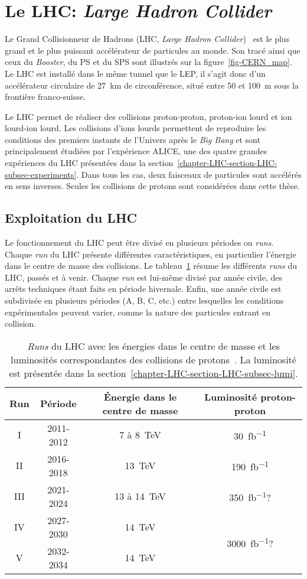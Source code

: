 \section{Le LHC: \emph{Large Hadron Collider}}\label{chapter-LHC-section-LHC}
Le Grand Collisionneur de Hadrons (LHC, \emph{Large Hadron Collider})~\cite{LHC_paper1,LHC_paper2,LHC_paper3} est le plus grand et le plus puissant accélérateur de particules au monde.
Son tracé ainsi que ceux du \emph{Booster}, du PS et du SPS sont illustrés sur la figure~\ref{fig-CERN_map}.
Le LHC est installé dans le même tunnel que le LEP, il s'agit donc d'un accélérateur circulaire de \SI{27}{\kilo\meter} de circonférence, situé entre \num{50} et \SI{100}{\meter} sous la frontière franco-suisse.
\par Le LHC permet de réaliser des collisions proton-proton, proton-ion lourd et ion lourd-ion lourd.
Les collisions d'ions lourds permettent de reproduire les conditions des premiers instants de l'Univers après le \emph{Big Bang} et sont principalement étudiées par l'expérience ALICE, une des quatre grandes expériences du LHC présentées dans la section~\ref{chapter-LHC-section-LHC-subsec-experiments}.
Dans tous les cas, deux faisceaux de particules sont accélérés en sens inverses.
Seules les collisions de protons sont considérées dans cette thèse.
\subsection{Exploitation du LHC}\label{chapter-LHC-section-LHC-subsec-LHC_runs}
Le fonctionnement du LHC peut être divisé en plusieurs périodes ou \emph{runs}.
Chaque \emph{run} du LHC présente différentes caractéristiques, en particulier l'énergie dans le centre de masse des collisions.
Le tableau~\ref{tab-LHC_runs} résume les différents \emph{runs} du LHC, passés et à venir.
Chaque \emph{run} est lui-même divisé par année civile, des arrêts techniques étant faits en période hivernale.
Enfin, une année civile est subdivisée en plusieurs périodes (A, B, C, etc.) entre lesquelles les conditions expérimentales peuvent varier, comme la nature des particules entrant en collision.
\begin{table}[h]
\centering
\begin{tabular}{cccc}
\toprule
Run & Période & Énergie dans le centre de masse & Luminosité proton-proton\\
\midrule
I & 2011-2012 & 7 à \SI{8}{\TeV} & \SI{30}{\femto\barn^{-1}} \\
II & 2016-2018 & \SI{13}{\TeV} & \SI{190}{\femto\barn^{-1}} \\
III & 2021-2024 & 13 à \SI{14}{\TeV} & \SI{350}{\femto\barn^{-1}}? \\
IV & 2027-2030 & \SI{14}{\TeV} & \multirow{2}{*}{\SI{3000}{\femto\barn^{-1}}?}\\
V & 2032-2034 & \SI{14}{\TeV} & \\
\bottomrule
\end{tabular}
\caption[\emph{Runs} du LHC.]{\emph{Runs} du LHC avec les énergies dans le centre de masse et les luminosités correspondantes des collisions de protons~\cite{LHC_commissioning}. La luminosité est présentée dans la section~\ref{chapter-LHC-section-LHC-subsec-lumi}.}
\label{tab-LHC_runs}
\end{table}
